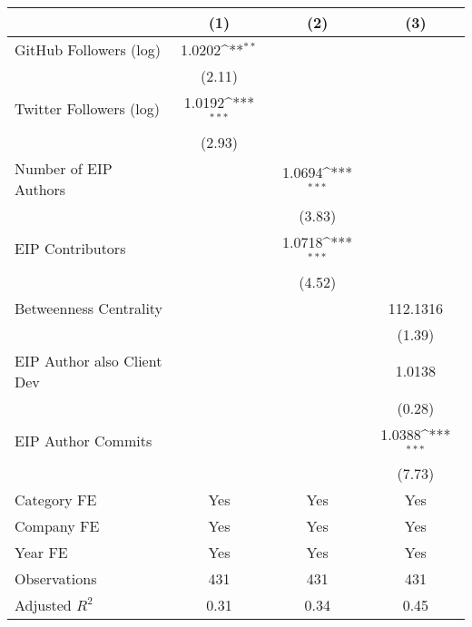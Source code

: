 {
\def\sym#1{\ifmmode^{#1}\else\(^{#1}\)\fi}
\begin{tabular}{l*{3}{c}}
\hline\hline
                                   &\multicolumn{1}{c}{(1)}         &\multicolumn{1}{c}{(2)}         &\multicolumn{1}{c}{(3)}         \\
\hline
GitHub Followers (log)             &      1.0202\sym{**} &                     &                     \\
                                   &      (2.11)         &                     &                     \\
[1em]
Twitter Followers (log)            &      1.0192\sym{***}&                     &                     \\
                                   &      (2.93)         &                     &                     \\
[1em]
Number of EIP Authors              &                     &      1.0694\sym{***}&                     \\
                                   &                     &      (3.83)         &                     \\
[1em]
EIP Contributors                   &                     &      1.0718\sym{***}&                     \\
                                   &                     &      (4.52)         &                     \\
[1em]
Betweenness Centrality             &                     &                     &    112.1316         \\
                                   &                     &                     &      (1.39)         \\
[1em]
EIP Author also Client Dev         &                     &                     &      1.0138         \\
                                   &                     &                     &      (0.28)         \\
[1em]
EIP Author Commits                 &                     &                     &      1.0388\sym{***}\\
                                   &                     &                     &      (7.73)         \\
[1em]
Category FE                        &         Yes         &         Yes         &         Yes         \\
[1em]
Company FE                         &         Yes         &         Yes         &         Yes         \\
[1em]
Year FE                            &         Yes         &         Yes         &         Yes         \\
\hline
Observations                       &         431         &         431         &         431         \\
Adjusted \(R^{2}\)                 &        0.31         &        0.34         &        0.45         \\
\hline\hline
\end{tabular}
}
